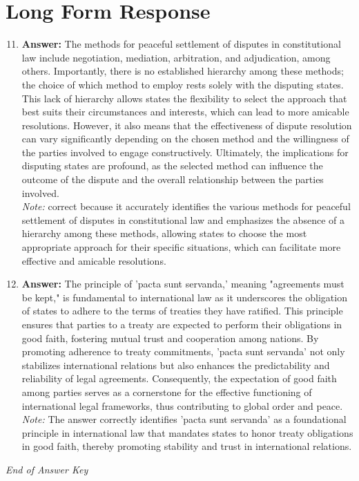 \documentclass[12pt]{article}
\begin{document}
\section*{Long Form Response}
\begin{enumerate}[label=\arabic*.]
\setcounter{enumi}{10}
\item \textbf{Answer:} The methods for peaceful settlement of disputes in constitutional law include negotiation, mediation, arbitration, and adjudication, among others. Importantly, there is no established hierarchy among these methods; the choice of which method to employ rests solely with the disputing states. This lack of hierarchy allows states the flexibility to select the approach that best suits their circumstances and interests, which can lead to more amicable resolutions. However, it also means that the effectiveness of dispute resolution can vary significantly depending on the chosen method and the willingness of the parties involved to engage constructively. Ultimately, the implications for disputing states are profound, as the selected method can influence the outcome of the dispute and the overall relationship between the parties involved.
\\ \textit{Note:} correct because it accurately identifies the various methods for peaceful settlement of disputes in constitutional law and emphasizes the absence of a hierarchy among these methods, allowing states to choose the most appropriate approach for their specific situations, which can facilitate more effective and amicable resolutions.
\item \textbf{Answer:} The principle of 'pacta sunt servanda,' meaning "agreements must be kept," is fundamental to international law as it underscores the obligation of states to adhere to the terms of treaties they have ratified. This principle ensures that parties to a treaty are expected to perform their obligations in good faith, fostering mutual trust and cooperation among nations. By promoting adherence to treaty commitments, 'pacta sunt servanda' not only stabilizes international relations but also enhances the predictability and reliability of legal agreements. Consequently, the expectation of good faith among parties serves as a cornerstone for the effective functioning of international legal frameworks, thus contributing to global order and peace.
\\ \textit{Note:} The answer correctly identifies 'pacta sunt servanda' as a foundational principle in international law that mandates states to honor treaty obligations in good faith, thereby promoting stability and trust in international relations.
\end{enumerate}

\vfill
\noindent\textit{End of Answer Key}
\end{document}
